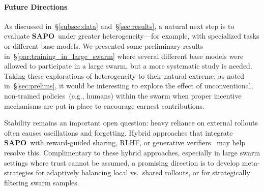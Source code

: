 \documentclass[11pt, a4paper, logo, singlecolumn, copyright]{gensyn}
\newcommand{\SAPO}{\textbf{SAPO}}
\begin{document}
\paragraph{Future Directions}
As discussed in~\S\ref{subsec:data} and~\S\ref{sec:results}, a natural next step is to evaluate \SAPO~under greater heterogeneity---for example, with specialized tasks or different base models. We presented some preliminary results in~\S\ref{par:training_in_large_swarm} where several different base models were allowed to participate in a large swarm, but a more systematic study is needed. Taking these explorations of heterogeneity to their natural extreme, as noted in~\S\ref{sec:prelims}, it would be interesting to explore the effect of unconventional, non-trained policies~(e.g., humans) within the swarm when proper incentive mechanisms are put in place to encourage earnest contributions.

Stability remains an important open question: heavy reliance on external rollouts often causes oscillations and forgetting. Hybrid approaches that integrate \SAPO~with reward-guided sharing, RLHF, or generative verifiers~\citep{zhang2025generativeverifiersrewardmodeling} may help resolve this. Complimentary to these hybrid approaches, especially in large swarm settings where trust cannot be assumed, a promising direction is to develop meta-strategies for adaptively balancing local vs.~shared rollouts, or for strategically filtering swarm samples. 

\end{document}
